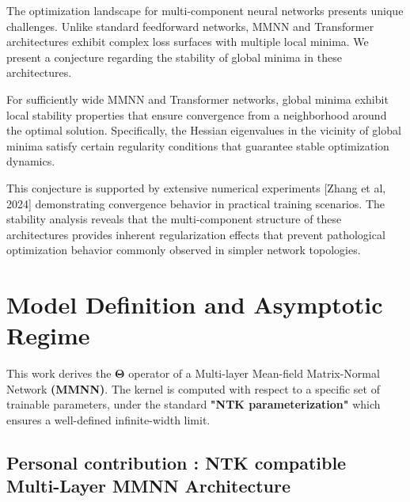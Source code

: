 \documentclass[a4paper]{article}
\theoremstyle{plain}
\theoremstyle{definition}
\theoremstyle{remark}
\begin{document}
The optimization landscape for multi-component neural networks presents unique challenges. Unlike standard feedforward networks, MMNN and Transformer architectures exhibit complex loss surfaces with multiple local minima. We present a conjecture regarding the stability of global minima in these architectures.
\begin{tcolorbox}[colback=green!15,colframe=green!80!black,title={\textbf{Conjecture: Global Minima Stability}},enhanced,drop shadow,boxrule=2pt]
For sufficiently wide MMNN and Transformer networks, global minima exhibit local stability properties that ensure convergence from a neighborhood around the optimal solution. Specifically, the Hessian eigenvalues in the vicinity of global minima satisfy certain regularity conditions that guarantee stable optimization dynamics.
\end{tcolorbox}

This conjecture is supported by extensive numerical experiments [Zhang et al, 2024] demonstrating convergence behavior in practical training scenarios. The stability analysis reveals that the multi-component structure of these architectures provides inherent regularization effects that prevent pathological optimization behavior commonly observed in simpler network topologies.








\section{Model Definition and Asymptotic Regime}

\begin{tcolorbox}[colback=green!15,colframe=green!80!black,title={\textbf{Objective and Scope}},enhanced,drop shadow,boxrule=2pt]
This work derives the $\boldsymbol{\Theta}$ operator of a Multi-layer Mean-field Matrix-Normal Network \textbf{(MMNN)}. The kernel is computed with respect to a specific set of trainable parameters, under the standard \textbf{"NTK parameterization"} which ensures a well-defined infinite-width limit.
\end{tcolorbox}




\subsection{Personal contribution : NTK compatible Multi-Layer MMNN Architecture}
\end{document}
